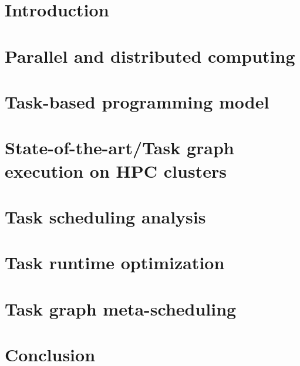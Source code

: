 \documentclass[english,phd]{diploma}
\begin{document}
\MakeTitlePages

\printglossaries

\listoffigures
\clearpage

\listoftables
\clearpage

\nocite{estee, rsds, ligate}

\chapter{Introduction}
\label{ch:Introduction}


\chapter{Parallel and distributed computing}
\label{ch:distributed-computing}


\chapter{Task-based programming model}
\label{ch:taskgraphs}


\chapter{State-of-the-art/Task graph execution on HPC clusters}
\label{ch:sota}


\chapter{Task scheduling analysis}
\label{ch:estee}


\chapter{Task runtime optimization}
\label{ch:rsds}


\chapter{Task graph meta-scheduling}
\label{ch:hyperqueue}


\chapter{Conclusion}
\label{ch:conclusion}

\end{document}
